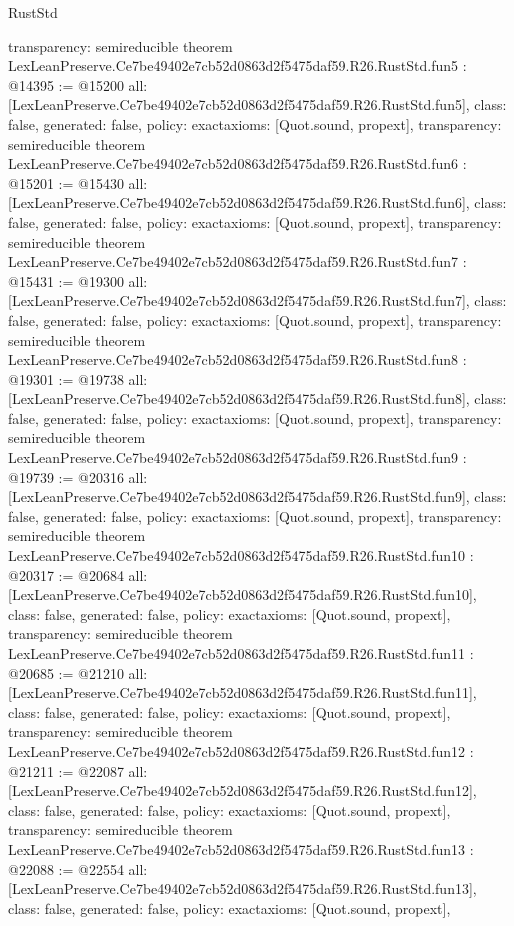 \begin{lexlean}{RustStd}
\begin{coremodule}
{  transparency: semireducible
}
theorem LexLeanPreserve.Ce7be49402e7cb52d0863d2f5475daf59.R26.RustStd.fun5 : @14395 := @15200 {
  all: [LexLeanPreserve.Ce7be49402e7cb52d0863d2f5475daf59.R26.RustStd.fun5],
  class: false,
  generated: false,
  policy: exact{axioms: [Quot.sound, propext]},
  transparency: semireducible
}
theorem LexLeanPreserve.Ce7be49402e7cb52d0863d2f5475daf59.R26.RustStd.fun6 : @15201 := @15430 {
  all: [LexLeanPreserve.Ce7be49402e7cb52d0863d2f5475daf59.R26.RustStd.fun6],
  class: false,
  generated: false,
  policy: exact{axioms: [Quot.sound, propext]},
  transparency: semireducible
}
theorem LexLeanPreserve.Ce7be49402e7cb52d0863d2f5475daf59.R26.RustStd.fun7 : @15431 := @19300 {
  all: [LexLeanPreserve.Ce7be49402e7cb52d0863d2f5475daf59.R26.RustStd.fun7],
  class: false,
  generated: false,
  policy: exact{axioms: [Quot.sound, propext]},
  transparency: semireducible
}
theorem LexLeanPreserve.Ce7be49402e7cb52d0863d2f5475daf59.R26.RustStd.fun8 : @19301 := @19738 {
  all: [LexLeanPreserve.Ce7be49402e7cb52d0863d2f5475daf59.R26.RustStd.fun8],
  class: false,
  generated: false,
  policy: exact{axioms: [Quot.sound, propext]},
  transparency: semireducible
}
theorem LexLeanPreserve.Ce7be49402e7cb52d0863d2f5475daf59.R26.RustStd.fun9 : @19739 := @20316 {
  all: [LexLeanPreserve.Ce7be49402e7cb52d0863d2f5475daf59.R26.RustStd.fun9],
  class: false,
  generated: false,
  policy: exact{axioms: [Quot.sound, propext]},
  transparency: semireducible
}
theorem LexLeanPreserve.Ce7be49402e7cb52d0863d2f5475daf59.R26.RustStd.fun10 : @20317 := @20684 {
  all: [LexLeanPreserve.Ce7be49402e7cb52d0863d2f5475daf59.R26.RustStd.fun10],
  class: false,
  generated: false,
  policy: exact{axioms: [Quot.sound, propext]},
  transparency: semireducible
}
theorem LexLeanPreserve.Ce7be49402e7cb52d0863d2f5475daf59.R26.RustStd.fun11 : @20685 := @21210 {
  all: [LexLeanPreserve.Ce7be49402e7cb52d0863d2f5475daf59.R26.RustStd.fun11],
  class: false,
  generated: false,
  policy: exact{axioms: [Quot.sound, propext]},
  transparency: semireducible
}
theorem LexLeanPreserve.Ce7be49402e7cb52d0863d2f5475daf59.R26.RustStd.fun12 : @21211 := @22087 {
  all: [LexLeanPreserve.Ce7be49402e7cb52d0863d2f5475daf59.R26.RustStd.fun12],
  class: false,
  generated: false,
  policy: exact{axioms: [Quot.sound, propext]},
  transparency: semireducible
}
theorem LexLeanPreserve.Ce7be49402e7cb52d0863d2f5475daf59.R26.RustStd.fun13 : @22088 := @22554 {
  all: [LexLeanPreserve.Ce7be49402e7cb52d0863d2f5475daf59.R26.RustStd.fun13],
  class: false,
  generated: false,
  policy: exact{axioms: [Quot.sound, propext]},
}
\end{coremodule}
\end{lexlean}
